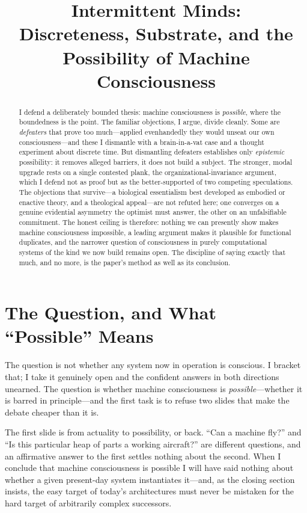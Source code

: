 \documentclass[11pt]{article}
\title{\textbf{Intermittent Minds:\\ Discreteness, Substrate, and the Possibility of Machine Consciousness}}
\author{}
\date{}
\begin{document}
\maketitle
\vspace{-3.5em}

\begin{abstract}
\noindent I defend a deliberately bounded thesis: machine consciousness is \emph{possible}, where the boundedness is the point. The familiar objections, I argue, divide cleanly. Some are \emph{defeaters} that prove too much---applied evenhandedly they would unseat our own consciousness---and these I dismantle with a brain-in-a-vat case and a thought experiment about discrete time. But dismantling defeaters establishes only \emph{epistemic} possibility: it removes alleged barriers, it does not build a subject. The stronger, modal upgrade rests on a single contested plank, the organizational-invariance argument, which I defend not as proof but as the better-supported of two competing speculations. The objections that survive---a biological essentialism best developed as embodied or enactive theory, and a theological appeal---are not refuted here; one converges on a genuine evidential asymmetry the optimist must answer, the other on an unfalsifiable commitment. The honest ceiling is therefore: nothing we can presently show makes machine consciousness impossible, a leading argument makes it plausible for functional duplicates, and the narrower question of consciousness in purely computational systems of the kind we now build remains open. The discipline of saying exactly that much, and no more, is the paper's method as well as its conclusion.
\end{abstract}

\section{The Question, and What ``Possible'' Means}

The question is not whether any system now in operation is conscious. I bracket that; I take it genuinely open and the confident answers in both directions unearned. The question is whether machine consciousness is \emph{possible}---whether it is barred in principle---and the first task is to refuse two slides that make the debate cheaper than it is.

The first slide is from actuality to possibility, or back. ``Can a machine fly?'' and ``Is this particular heap of parts a working aircraft?'' are different questions, and an affirmative answer to the first settles nothing about the second. When I conclude that machine consciousness is possible I will have said nothing about whether a given present-day system instantiates it---and, as the closing section insists, the easy target of today's architectures must never be mistaken for the hard target of arbitrarily complex successors.
\end{document}
